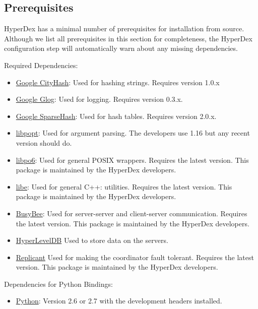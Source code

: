 \subsection{Prerequisites}
\label{sec:installation:source:deps}

HyperDex has a minimal number of prerequisites for installation from source.
Although we list all prerequisites in this section for completeness, the
HyperDex configuration step will automatically warn about any missing
dependencies.

Required Dependencies:

\begin{itemize}
\item \href{http://code.google.com/p/cityhash/}{Google CityHash}:  Used for
    hashing strings.  Requires version 1.0.x
\item \href{http://code.google.com/p/google-glog/}{Google Glog}:  Used for
    logging.  Requires version 0.3.x.
\item \href{https://code.google.com/p/sparsehash/}{Google SparseHash}:  Used for
    hash tables.  Requires version 2.0.x.
\item \href{http://rpm5.org/}{libpopt}: Used for argument parsing.  The
    developers use 1.16 but any recent version should do.
\item \href{http://hyperdex.org/downloads/}{libpo6}: Used for general POSIX
    wrappers.  Requires the latest version.  This package is maintained by the
    HyperDex developers.
\item \href{http://hyperdex.org/downloads/}{libe}: Used for general C++:
    utilities.  Requires the latest version.  This package is maintained by the
    HyperDex developers.
\item \href{http://hyperdex.org/downloads/}{BusyBee}: Used for server-server
    and client-server communication.  Requires the latest version.  This package
    is maintained by the HyperDex developers.
\item \href{http://hyperdex.org/downloads/}{HyperLevelDB}  Used to store data
    on the servers.
\item \href{http://hyperdex.org/downloads/}{Replicant} Used for making the
    coordinator fault tolerant.  Requires the latest version.  This package is
    maintained by the HyperDex developers.
\end{itemize}

Dependencies for Python Bindings:

\begin{itemize}
\item \href{http://python.org/}{Python}: Version 2.6 or 2.7 with the
    development headers installed.
\end{itemize}

